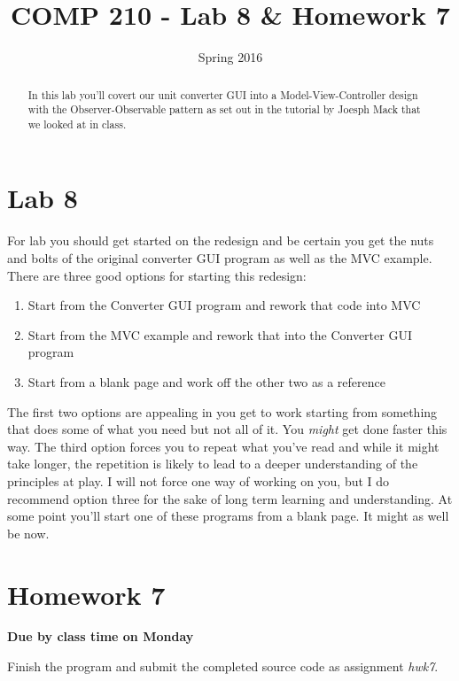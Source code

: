 \documentclass[]{tufte-handout}
\title{COMP 210 - Lab 8 \& Homework 7}
\date{Spring 2016}
\begin{document}
 
\maketitle

\begin{abstract}
In this lab you'll covert our unit converter GUI into a Model-View-Controller design with the Observer-Observable pattern as set out in the tutorial by Joesph Mack that we looked at in class. 
\end{abstract}

\section{Lab 8}

For lab you should get started on the redesign and be certain you get the nuts and bolts of the original converter GUI program as well as the MVC example. There are three good options for starting this redesign:
\begin{enumerate}
\item Start from the Converter GUI program and rework that code into MVC
\item Start from the MVC example and rework that into the Converter GUI program
\item Start from a blank page and work off the other two as a reference
\end{enumerate}

The first two options are appealing in you get to work starting from something that does some of what you need but not all of it. You \textit{might} get done faster this way. The third option forces you to repeat what you've read and while it might take longer, the repetition is likely to lead to a deeper understanding of the principles at play.  I will not force one way of working on you, but I do recommend option three for the sake of long term learning and understanding. At some point you'll start one of these programs from a blank page. It might as well be now.   


\section{Homework 7}

\begin{center}
\textbf{Due by class time on Monday}
\end{center}

Finish the program and submit the completed source code as assignment \textit{hwk7}.
\end{document}
